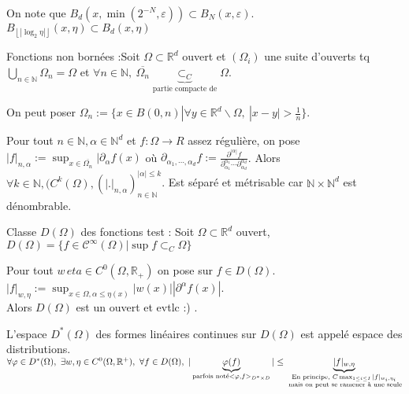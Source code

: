 On note que $B_d(x,\min(2^{-N}, \varepsilon ))\subset B_N(x,\varepsilon )$.\\
$B_{\left\lfloor |\log_2\eta| \right\rfloor}(x,\eta)\subset B_d(x, \eta)$

\begin{ex}
Fonctions non bornées :Soit $\Omega\subset \mathbb{R} ^d$ ouvert et $(\Omega_i)$ une suite d'ouverts tq $\bigcup_{n\in \mathbb{N} }\Omega_n =\Omega$ et $\forall n\in \mathbb{N} ,\ \overline{\Omega_n}\underbrace{\subset_C }_{\text{partie compacte de}} \Omega $.
\end{ex}

\begin{remarque}
    On peut poser $\Omega_n:=\{x\in B(0,n)|\forall y\in \mathbb{R} ^d\backslash \Omega,\ |x-y|>\frac{1}{n} \} $.
\end{remarque}

Pour tout $n\in \mathbb{N} , \alpha \in \mathbb{N} ^d$ et $f:\Omega\to R$ assez régulière, on pose $|f|_{n,\alpha }:=\sup_{x\in \overline{\Omega_n}}|\partial_\alpha f(x)$ où $\partial_{\alpha _1,\cdots, \alpha _d}f:=\frac{\partial ^{|\alpha|}f}{\partial_{\alpha_1}^{\alpha _1}\cdots\partial_{\alpha _d}^{\alpha _d} } $. Alors $\forall k\in \mathbb{N} , (C^k(\Omega),(|.|_{n,\alpha })^{|\alpha |\le k}_{n\in \mathbb{N} }  $. Est séparé et métrisable car $\mathbb{N} \times\mathbb{N} ^d$ est dénombrable.

\begin{ex}
    Classe $D(\Omega)$ des fonctions test : Soit $\Omega\subset \mathbb{R} ^d$ ouvert, $D(\Omega)=\{f\in \mathcal{C}^\infty (\Omega)|\sup f\subset _C\Omega\} $
\end{ex}

Pour tout $w\,eta\in C^0(\Omega,\mathbb{R} _+)$ on pose sur $f\in D(\Omega)$. $|f|_{w,\eta}:=\sup_{x\in \Omega, \alpha \le \eta(x)}|w(x)| |\partial^\alpha f(x)|$. \\

Alors $D(\Omega)$ est un ouvert et evtlc :) .

L'espace $D^*(\Omega)$ des formes linéaires continues sur $D(\Omega)$ est appelé espace des distributions. \\
$\forall \varphi \in D^*(\Omega),\ \exists w,\eta\in C^0(\Omega,\mathbb{R} ^+), \ \forall f\in D(\Omega),\ |\underbrace{\varphi (f)}_{\text{parfois noté}\\<\varphi ,f>_{D^*\times D}}|\le \underbrace{|f|_{w, \eta}}_{\substack{\text{En principe, } C\max_{1\le i\le I}|f|_{w_i , \eta_i} \\\text{ mais on peut se ramener à une seule}}}$

